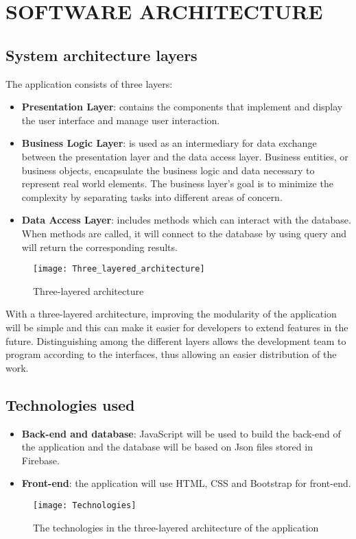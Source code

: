 \section{SOFTWARE ARCHITECTURE}
\subsection{System architecture layers}
The application consists of three layers:
\begin{itemize}
	\item \textbf{Presentation Layer}: contains the components that implement and display the user interface and manage user interaction.
	\item \textbf{Business Logic Layer}: is used as an intermediary for data exchange between the presentation layer and the data access layer. Business entities, or business objects, encapsulate the business logic and data necessary to represent real world elements. The business layer's goal is to minimize the complexity by separating tasks into different areas of concern.  
	\item \textbf{Data Access Layer}: includes methods which can interact with the database. When methods are called, it will connect to the database by using query and will return the corresponding results.  
\end{itemize} 
\begin{figure}[H]
	\centering
	\texttt{[image: Three\_layered\_architecture]}
	\caption{Three-layered architecture}
\end{figure}
With a three-layered architecture, improving the modularity of the application will be simple and this can make it easier for developers to extend features in the future. Distinguishing among the different layers allows the development team to program according to the interfaces, thus allowing an easier distribution of the work.  
\subsection{Technologies used}
\begin{itemize}
	\item \textbf{Back-end and database}: JavaScript will be used to build the back-end of the application and the database will be based on Json files stored in Firebase.
	\item \textbf{Front-end}: the application will use HTML, CSS and Bootstrap for front-end.
\end{itemize}
\begin{figure}[H]
	\centering
	\texttt{[image: Technologies]}
	\caption{The technologies in the three-layered architecture of the application}
\end{figure}